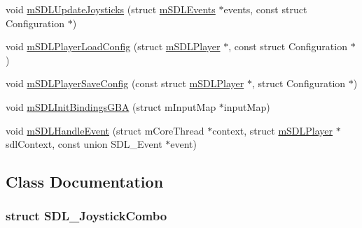 \begin{DoxyCompactItemize}
\item 
void \mbox{\hyperlink{sdl-events_8h_a6174eb5a5de369faa9936c653489d8ee}{m\+S\+D\+L\+Update\+Joysticks}} (struct \mbox{\hyperlink{sdl-events_8h_structm_s_d_l_events}{m\+S\+D\+L\+Events}} $\ast$events, const struct Configuration $\ast$)
\item 
void \mbox{\hyperlink{sdl-events_8h_afe63fe20f988ad01630127c84e300223}{m\+S\+D\+L\+Player\+Load\+Config}} (struct \mbox{\hyperlink{sdl-events_8h_structm_s_d_l_player}{m\+S\+D\+L\+Player}} $\ast$, const struct Configuration $\ast$)
\item 
void \mbox{\hyperlink{sdl-events_8h_a21daeab8663f45a3ab0104f8ae0abb18}{m\+S\+D\+L\+Player\+Save\+Config}} (const struct \mbox{\hyperlink{sdl-events_8h_structm_s_d_l_player}{m\+S\+D\+L\+Player}} $\ast$, struct Configuration $\ast$)
\item 
void \mbox{\hyperlink{sdl-events_8h_a254830bd4cde57bec6bf2dade355902f}{m\+S\+D\+L\+Init\+Bindings\+G\+BA}} (struct m\+Input\+Map $\ast$input\+Map)
\item 
void \mbox{\hyperlink{sdl-events_8h_a32623e2272fd40a24e3941e351a273a4}{m\+S\+D\+L\+Handle\+Event}} (struct m\+Core\+Thread $\ast$context, struct \mbox{\hyperlink{sdl-events_8h_structm_s_d_l_player}{m\+S\+D\+L\+Player}} $\ast$sdl\+Context, const union S\+D\+L\+\_\+\+Event $\ast$event)
\end{DoxyCompactItemize}


\subsection{Class Documentation}
\label{struct_s_d_l___joystick_combo}
\subsubsection{struct S\+D\+L\+\_\+\+Joystick\+Combo}


